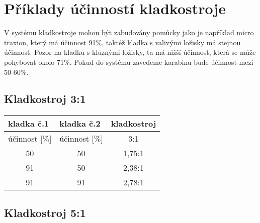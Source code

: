 \chapter{Příklady účinností kladkostroje}
\label{Souhrn}
\def\figurename{Obr.} %
\def\tablename{Tab.} %
\def\figureautorefname{obr.} %
\def\tableautorefname{tab.} %
\def\chapterautorefname{kapitola} %

V systému kladkostroje mohou být zabudovány pomůcky jako je například micro traxion, který má účinnost 91\%, taktéž kladka s valivými ložisky má stejnou účinnost. Pozor na kladku s kluznými ložisky, ta má nižší účinnost, která se může pohybovat okolo 71\%. Pokud do systému zavedeme karabinu bude účinnost mezi 50-60\%.


\section{Kladkostroj 3:1}

\begin{table}[h!] %
    \begin{tabular}{|c|c|c|}
        \hline
        \multicolumn{1}{|l|}{kladka č.1} & \multicolumn{1}{l|}{kladka č.2} & \multicolumn{1}{l|}{kladkostroj} \\ \hline
        {účinnost [}\%{]}                & {účinnost [}\%{]}               & 3:1                              \\ \hline
        50                               & 50                              & 1,75:1                           \\ \hline
        91                               & 50                              & 2,38:1                           \\ \hline
        91                               & 91                              & 2,78:1                           \\ \hline
    \end{tabular}
\end{table}

\section{Kladkostroj 5:1}


